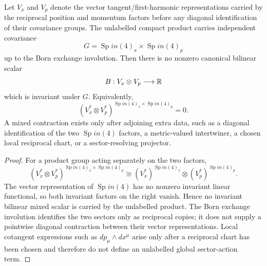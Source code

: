 \documentclass[12pt,a4paper]{article}
\begin{document}
\begin{lemma}
\label{p3:lem:no-invariant-mixed-vector-contraction}
Let \(V_x\) and \(V_p\) denote the vector tangent/first-harmonic representations carried by the reciprocal position and momentum factors before any diagonal identification of their covariance groups.  The unlabelled compact product carries independent covariance
\[
        G=\operatorname{Sp}in(4)_x\times\operatorname{Sp}in(4)_p
\]
up to the Born exchange involution.  Then there is no nonzero canonical bilinear scalar
\[
        B:V_x\otimes V_p\longrightarrow \mathbb{R}
\]
which is invariant under \(G\).  Equivalently,
\[
        (V_x^*\otimes V_p^*)^{\operatorname{Sp}in(4)_x\times\operatorname{Sp}in(4)_p}=0 .
\]
A mixed contraction exists only after adjoining extra data, such as a diagonal identification of the two \(\operatorname{Sp}in(4)\) factors, a metric-valued intertwiner, a chosen local reciprocal chart, or a sector-resolving projector.
\end{lemma}

\begin{proof}
For a product group acting separately on the two factors,
\[
        (V_x^*\otimes V_p^*)^{\operatorname{Sp}in(4)_x\times\operatorname{Sp}in(4)_p}
        \cong
        (V_x^*)^{\operatorname{Sp}in(4)_x}\otimes (V_p^*)^{\operatorname{Sp}in(4)_p} .
\]
The vector representation of \(\operatorname{Sp}in(4)\) has no nonzero invariant linear functional, so both invariant factors on the right vanish.  Hence no invariant bilinear mixed scalar is carried by the unlabelled product.  The Born exchange involution identifies the two sectors only as reciprocal copies; it does not supply a pointwise diagonal contraction between their vector representations.  Local cotangent expressions such as \(dp_\mu\wedge dx^\mu\) arise only after a reciprocal chart has been chosen and therefore do not define an unlabelled global sector-action term.
\end{proof}
\end{document}

